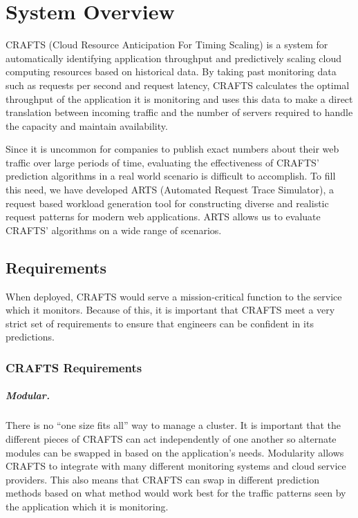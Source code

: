 \chapter{System Overview}
\label{ch:overview}
CRAFTS (Cloud Resource Anticipation For Timing Scaling) is a system for automatically identifying application throughput and predictively scaling cloud computing resources based on historical data. By taking past monitoring data such as requests per second and request latency, CRAFTS calculates the optimal throughput of the application it is monitoring and uses this data to make a direct translation between incoming traffic and the number of servers required to handle the capacity and maintain availability.

Since it is uncommon for companies to publish exact numbers about their web traffic over large periods of time, evaluating the effectiveness of CRAFTS' prediction algorithms in a real world scenario is difficult to accomplish. To fill this need, we have developed ARTS (Automated Request Trace Simulator), a request based workload generation tool for constructing diverse and realistic request patterns for modern web applications. ARTS allows us to evaluate CRAFTS' algorithms on a wide range of scenarios.

\section{Requirements}
When deployed, CRAFTS would serve a mission-critical function to the service which it monitors. Because of this, it is important that CRAFTS meet a very strict set of requirements to ensure that engineers can be confident in its predictions.

\subsection{CRAFTS Requirements}

\paragraph{Modular.} There is no ``one size fits all'' way to manage a cluster. It is important that the different pieces of CRAFTS can act independently of one another so alternate modules can be swapped in based on the application's needs. Modularity allows CRAFTS to integrate with many different monitoring systems and cloud service providers. This also means that CRAFTS can swap in different prediction methods based on what method would work best for the traffic patterns seen by the application which it is monitoring.

